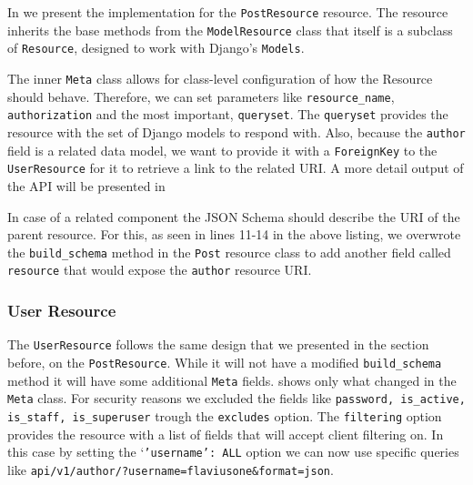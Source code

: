 In  we present the implementation for the \texttt{PostResource} resource. The resource inherits the base methods from the \texttt{ModelResource} class that itself is a subclass of \texttt{Resource}, designed to work with Django’s \texttt{Models}. 

	

The inner \texttt{Meta} class allows for class-level configuration of how the Resource should behave. Therefore, we can set parameters like \texttt{resource\_name}, \texttt{authorization} and the most important, \texttt{queryset}. The \texttt{queryset} provides the resource with the set of Django models to respond with. Also, because the \texttt{author} field is a related data model, we want to provide it with a \texttt{ForeignKey} to the \texttt{UserResource} for it to retrieve a link to the related URI. A more detail output of the API will be presented in 

In case of a related component the JSON Schema should describe the URI of the parent resource. For this, as seen in lines 11-14 in the above listing,  we overwrote the \texttt{build\_schema} method in the \texttt{Post} resource class to add another field called \texttt{resource} that would expose the \texttt{author} resource URI.


\subsubsection{User Resource}
\label{sub-sub-sec:user-resource}

The \texttt{UserResource} follows the same design that we presented in the section before, on the \texttt{PostResource}. While it will not have a modified \texttt{build\_schema} method it will have some additional \texttt{Meta} fields.  shows only what changed in the \texttt{Meta} class. For security reasons we excluded the fields like \texttt{password, is\_active, is\_staff, is\_superuser} trough the \texttt{excludes} option. The \texttt{filtering} option provides the resource with a list of fields that will accept client filtering on. In this case by setting the `\texttt{'username': ALL} option we can now use specific queries like \texttt{api/v1/author/?username=flaviusone\&format=json}.



